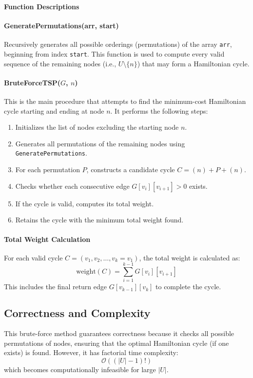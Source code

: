 \pagebreak
\textbf{Function Descriptions}

\paragraph{GeneratePermutations(arr, start)} 
Recursively generates all possible orderings (permutations) of the array \texttt{arr}, beginning from index \texttt{start}. This function is used to compute every valid sequence of the remaining nodes (i.e., $U \setminus \{n\}$) that may form a Hamiltonian cycle.

\paragraph{BruteForceTSP($G$, $n$)} 
This is the main procedure that attempts to find the minimum-cost Hamiltonian cycle starting and ending at node $n$. It performs the following steps:

\begin{enumerate}
    \item Initializes the list of nodes excluding the starting node $n$.
    \item Generates all permutations of the remaining nodes using \texttt{GeneratePermutations}.
    \item For each permutation $P$, constructs a candidate cycle $C = (n) + P + (n)$.
    \item Checks whether each consecutive edge $G[v_i][v_{i+1}] > 0$ exists.
    \item If the cycle is valid, computes its total weight.
    \item Retains the cycle with the minimum total weight found.
\end{enumerate}

\paragraph{Total Weight Calculation}
For each valid cycle $C = (v_1, v_2, \ldots, v_k = v_1)$, the total weight is calculated as:
\[
\text{weight}(C) = \sum_{i=1}^{k-1} G[v_i][v_{i+1}]
\]
This includes the final return edge $G[v_{k-1}][v_k]$ to complete the cycle.

\subsection*{Correctness and Complexity}

This brute-force method guarantees correctness because it checks all possible permutations of nodes, ensuring that the optimal Hamiltonian cycle (if one exists) is found. However, it has factorial time complexity:
\[
\mathcal{O}((|U| - 1)!)
\]
which becomes computationally infeasible for large $|U|$.